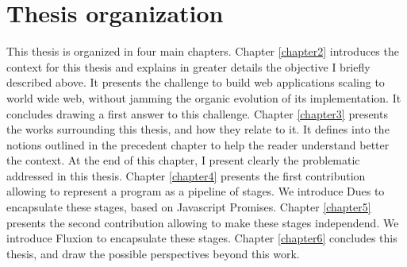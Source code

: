 \section{Thesis organization}

This thesis is organized in four main chapters.
Chapter \ref{chapter2} introduces the context for this thesis and explains in greater details the objective I briefly described above.
It presents the challenge to build web applications scaling to world wide web, without jamming the organic evolution of its implementation.
It concludes drawing a first answer to this challenge.
Chapter \ref{chapter3} presents the works surrounding this thesis, and how they relate to it.
It defines into the notions outlined in the precedent chapter to help the reader understand better the context.
At the end of this chapter, I present clearly the problematic addressed in this thesis.
Chapter \ref{chapter4} presents the first contribution allowing to represent a program as a pipeline of stages.
We introduce Dues to encapsulate these stages, based on Javascript Promises.
Chapter \ref{chapter5} presents the second contribution allowing to make these stages independend.
We introduce Fluxion to encapsulate these stages.
Chapter \ref{chapter6} concludes this thesis, and draw the possible perspectives beyond this work.

